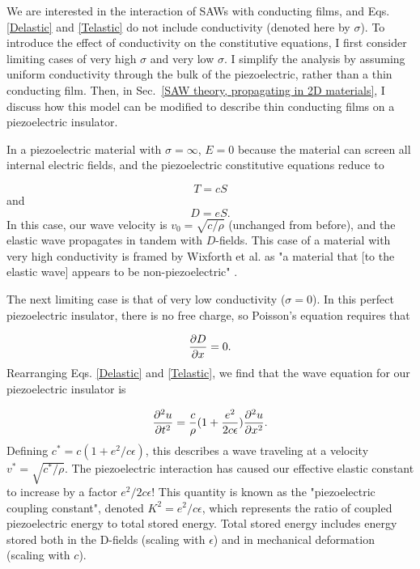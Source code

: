 \documentclass[double,12pt,1in,seploa]{beavtex}
\begin{document}
We are interested in the interaction of SAWs with conducting films, and Eqs. \ref{Delastic} and \ref{Telastic} do not include conductivity (denoted here by $\sigma$). To introduce the effect of conductivity on the constitutive equations, I first consider limiting cases of very high $\sigma$ and very low $\sigma$. I simplify the analysis by assuming uniform conductivity through the bulk of the piezoelectric, rather than a thin conducting film. Then, in Sec.\ \ref{SAW theory, propagating in 2D materials}, I discuss how this model can be modified to describe thin conducting films on a piezoelectric insulator.

In a piezoelectric material with $\sigma = \infty$, $E = 0$ because the material can screen all internal electric fields, and the piezoelectric constitutive equations reduce to 

\begin{equation}
    T = cS
\end{equation}
and
\begin{equation}
    D = eS.
\end{equation}
In this case, our wave velocity is $v_0 = \sqrt{c/\rho}$ (unchanged from before), and the elastic wave propagates in tandem with $D$-fields. This case of a material with very high conductivity is framed by Wixforth et al.  as "a material that [to the elastic wave] appears to be non-piezoelectric" \cite{wixforth_surface_1989}.

The next limiting case is that of very low conductivity ($\sigma = 0$). In this perfect piezoelectric insulator, there is no free charge, so Poisson's equation requires that 

\begin{equation}
    \pdv{D}{x} = 0.
\end{equation}
Rearranging Eqs. \ref{Delastic} and \ref{Telastic}, we find that the wave equation for our piezoelectric insulator is

\begin{equation}
    \pdv[2]{u}{t} = \frac{c}{\rho} (1 + \frac{e^2}{2c\epsilon}) \pdv[2]{u}{x}. \label{wave eqn for insulator}
\end{equation}
Defining $c^* = c(1 + e^2/c\epsilon)$, this describes a wave traveling at a velocity $v^* =\sqrt{c^*/\rho}$. The piezoelectric interaction has caused our effective elastic constant to increase by a factor $e^2/2c\epsilon$! This quantity is known as the "piezoelectric coupling constant", denoted $K^2 = e^2/c\epsilon$, which represents the ratio of coupled piezoelectric energy to total stored energy. Total stored energy includes energy stored both in the D-fields (scaling with $\epsilon$) and in mechanical deformation (scaling with $c$). 
\end{document}
